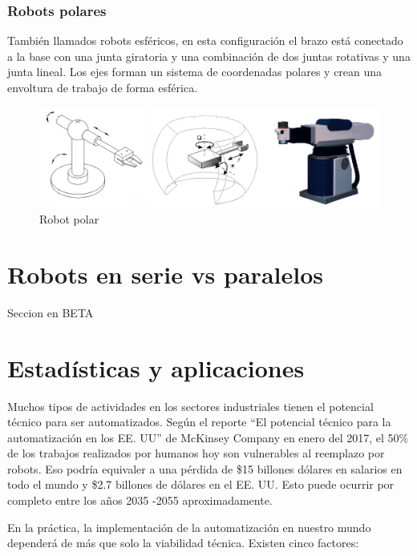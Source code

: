         \subsubsection{Robots polares}
        
        También llamados robots esféricos, en esta configuración el brazo está conectado a la base con una junta giratoria y una combinación de dos juntas rotativas y una junta lineal. Los ejes forman un sistema de coordenadas polares y crean una envoltura de trabajo de forma esférica.
        
        \begin{figure}[htb]
            \centering
            \includegraphics[width=0.9\linewidth]{Main/Chapter2/Images2/robot-polar.png}
            \caption{Robot polar}
            \label{f:Cap2_segunMovimiento_polar}
        \end{figure}
    
                \newpage

\section{Robots en serie vs paralelos}

    Seccion en BETA
                    \newpage


\section{Estadísticas y aplicaciones}

    Muchos tipos de actividades en los sectores industriales tienen el potencial técnico para ser automatizados. Según el reporte ``El potencial técnico para la automatización en los EE. UU'' de McKinsey Company en enero del 2017, el 50\% de los trabajos realizados por humanos hoy son vulnerables al reemplazo por robots. Eso podría equivaler a una pérdida de \$15 billones dólares en salarios en todo el mundo y \$2.7 billones de dólares en el EE. UU. Esto puede ocurrir por completo entre los años 2035 -2055 aproximadamente. 
    
    En la práctica, la implementación de la automatización en nuestro mundo dependerá de más que solo la viabilidad técnica. Existen cinco factores:

